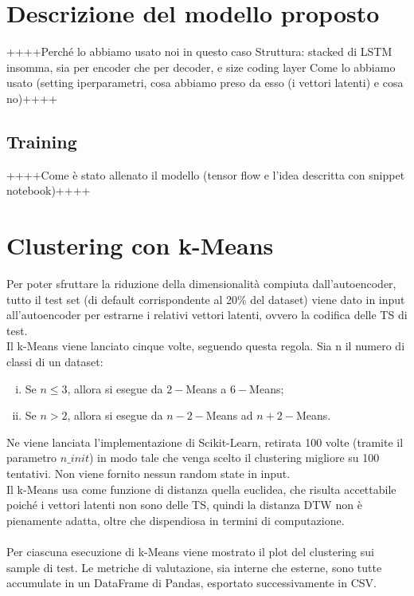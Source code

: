 \section{Descrizione del modello proposto}
++++Perché lo abbiamo usato noi in questo caso
Struttura: stacked di LSTM insomma, sia per encoder che per decoder, e size coding layer
Come lo abbiamo usato (setting iperparametri, cosa abbiamo preso da esso (i vettori latenti) e cosa no)++++

\subsection{Training}
++++Come è stato allenato il modello (tensor flow e l'idea descritta con snippet notebook)++++

\section{Clustering con k-Means}
Per poter sfruttare la riduzione della dimensionalità compiuta dall'autoencoder, tutto il test set (di default corrispondente al 20\% del dataset) viene dato in input all'autoencoder per estrarne i relativi vettori latenti, ovvero la codifica delle TS di test.\\
Il k-Means viene lanciato cinque volte, seguendo questa regola. Sia n il numero di classi di un dataset:
\begin{enumerate}[(i)]
	\item Se $n\leq3$, allora si esegue da $2-$Means a $6-$Means;
	\item Se $n>2$, allora si esegue da $n-2-$Means ad $n+2-$Means.
\end{enumerate}
Ne viene lanciata l'implementazione di Scikit-Learn, retirata 100 volte (tramite il parametro $n\_init$) in modo tale che venga scelto il clustering migliore su 100 tentativi. Non viene fornito nessun random state in input.\\
Il k-Means usa come funzione di distanza quella euclidea, che risulta accettabile poiché i vettori latenti non sono delle TS, quindi la distanza DTW non è pienamente adatta, oltre che dispendiosa in termini di computazione.\\
\\
Per ciascuna esecuzione di k-Means viene mostrato il plot del clustering sui sample di test. Le metriche di valutazione, sia interne che esterne, sono tutte accumulate in un DataFrame di Pandas, esportato successivamente in CSV.

